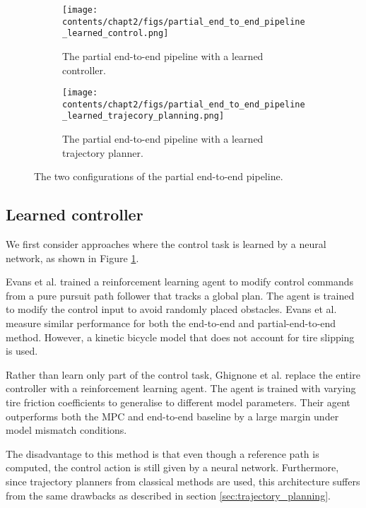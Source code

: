 \begin{figure}[h]
    \centering
    \begin{subfigure}[htb!]{\textwidth}
        \centering
        \texttt{[image: contents/chapt2/figs/partial\_end\_to\_end\_pipeline\_learned\_control.png]}
         \caption[The partial end-to-end pipeline with a learned controller]{The partial end-to-end pipeline with a learned controller.}
        \label{fig:pete_learned_control}
    \end{subfigure}
    \hfill
    \begin{subfigure}[htb!]{\textwidth}
        \centering
        \texttt{[image: contents/chapt2/figs/partial\_end\_to\_end\_pipeline\_learned\_trajecory\_planning.png]}
        \caption[The partial end-to-end pipeline with a learned trajectory planner]{The partial end-to-end pipeline with a learned trajectory planner.}
        \label{fig:pete_learned_trajectory_planning}
    \end{subfigure}
\caption[Configurations of the partial end-to-end pipeline]{The two configurations of the partial end-to-end pipeline.}
\label{fig:pete}
\end{figure}

\subsection{Learned controller}
\label{sec:learned_controller}
We first consider approaches where the control task is learned by a neural network, as shown in Figure \ref{fig:pete_learned_control}.

Evans et al. \cite{Evans2021b} trained a reinforcement learning agent to modify control commands from a pure pursuit path follower that tracks a global plan.
The agent is trained to modify the control input to avoid randomly placed obstacles.
Evans et al. \cite{Evans2021b} measure similar performance for both the end-to-end and partial-end-to-end method.
However, a kinetic bicycle model that does not account for tire slipping is used.

Rather than learn only part of the control task, Ghignone et al. \cite{Ghignone2022} replace the entire controller with a reinforcement learning agent.
The agent is trained with varying tire friction coefficients to generalise to different model parameters.
Their agent outperforms both the MPC and end-to-end baseline by a large margin under model mismatch conditions.

The disadvantage to this method is that even though a reference path is computed, the control action is still given by a neural network.
Furthermore, since trajectory planners from classical methods are used, this architecture suffers from the same drawbacks as described in section \ref{sec:trajectory_planning}.

